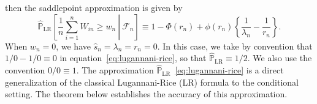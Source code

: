 \documentclass[12pt]{article}
\theoremstyle{definition}
\def\P{\mathbb{P}}
\def\P{\mathbb{P}}
\renewcommand{\P}{\mathbb{P}}							%
\begin{document}
  \normalsize
  then the saddlepoint approximation is given by
  \begin{equation}
  \widehat{\P}_{\text{LR}}\left[\left.\frac{1}{n}\sum_{i = 1}^n W_{in} \geq w_n\ \right|\ \mathcal{F}_n\right] \equiv 1-\Phi(r_n)+\phi(r_n)\left\{\frac{1}{\lambda_n}-\frac{1}{r_n}\right\}. \label{eq:lugannani-rice}
  \end{equation}
  When $w_n = 0$, we have $\hat s_n = \lambda_n = r_n = 0$. In this case, we take by convention that $1/0 - 1/0 \equiv 0$ in equation~\eqref{eq:lugannani-rice}, so that $\widehat{\P}_{\text{LR}} \equiv 1/2$. We also use the convention $0/0\equiv1$. The approximation $\widehat{\P}_{\text{LR}}$~\eqref{eq:lugannani-rice} is a direct generalization of the classical Lugannani-Rice (LR) formula \citep{Lugannani1980} to the conditional setting. The theorem below establishes the accuracy of this approximation.
  
\end{document}
